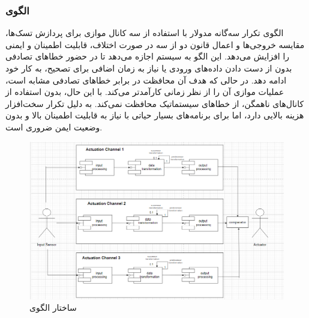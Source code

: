 \subsubsection{الگوی }
\label{archSafeTripModRedunSec}
\begin{RTL}
الگوی تکرار سه‌گانه مدولار  \cite{ref4} با استفاده از سه کانال
موازی برای پردازش تسک‌ها، مقایسه خروجی‌ها و اعمال قانون دو از سه
در صورت اختلاف، قابلیت اطمینان و ایمنی را افزایش می‌دهد. این الگو به
سیستم اجازه می‌دهد تا در حضور خطاهای تصادفی بدون از دست دادن داده‌های
ورودی یا نیاز به زمان اضافی برای تصحیح، به کار خود ادامه دهد.
در حالی که هدف آن محافظت در برابر خطاهای تصادفی مشابه
 است، عملیات موازی
 آن را از نظر زمانی کارآمدتر می‌کند.
با این حال، بدون استفاده از کانال‌های ناهمگن، از خطاهای سیستماتیک
محافظت نمی‌کند.  به دلیل تکرار سخت‌افزار هزینه بالایی دارد،
اما برای برنامه‌های بسیار حیاتی با نیاز به قابلیت اطمینان بالا
و بدون وضعیت ایمن ضروری است.
\end{RTL}
\begin{figure}[h!]
\centering
\includegraphics[scale=0.5]{images/second/triple.png}
\caption{ساختار الگوی }
\end{figure}
